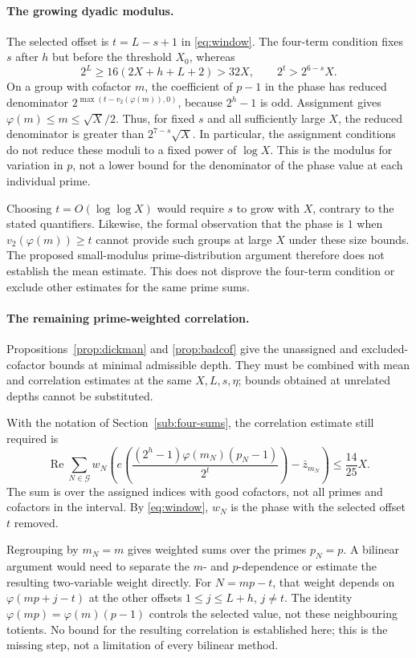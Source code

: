 \documentclass[11pt]{article}
\theoremstyle{plain}
\theoremstyle{definition}
\theoremstyle{remark}
\begin{document}
\paragraph{The growing dyadic modulus.}
The selected offset is $t=L-s+1$ in \eqref{eq:window}. The four-term
condition fixes $s$ after $h$ but before the threshold $X_0$, whereas
\[
 2^L\ge16(2X+h+L+2)>32X,\qquad 2^t>2^{6-s}X.
\]
On a group with cofactor $m$, the coefficient of $p-1$ in the phase
has reduced denominator $2^{\max(t-v_2(\varphi(m)),0)}$, because $2^h-1$
is odd. Assignment gives
$\varphi(m)\le m\le\sqrt X/2$. Thus, for fixed $s$ and all sufficiently
large $X$, the reduced denominator is greater than
$2^{7-s}\sqrt X$. In particular, the assignment conditions do not reduce
these moduli to a fixed power of $\log X$. This is the modulus for
variation in $p$, not a lower bound for the denominator of the phase
value at each individual prime.

Choosing $t=O(\log\log X)$ would require $s$ to grow with $X$, contrary
to the stated quantifiers. Likewise, the formal observation that the phase
is $1$ when $v_2(\varphi(m))\ge t$ cannot provide such groups at large $X$
under these size bounds. The proposed small-modulus prime-distribution
argument therefore does not establish the mean estimate. This does not
disprove the four-term condition or exclude other estimates for the same
prime sums.

\paragraph{The remaining prime-weighted correlation.}
Propositions~\ref{prop:dickman} and \ref{prop:badcof} give the unassigned
and excluded-cofactor bounds at minimal admissible depth. They must be
combined with mean and correlation estimates at the same $X,L,s,\eta$;
bounds obtained at unrelated depths cannot be substituted.

With the notation of Section~\ref{sub:four-sums}, the correlation estimate
still required is
\[
 \operatorname{Re}\sum_{N\in\mathcal G}w_N
 \left(e\!\left(\frac{(2^h-1)\varphi(m_N)(p_N-1)}{2^t}\right)
       -\bar z_{m_N}\right)\le\frac{14}{25}X.
\]
The sum is over the assigned indices with good cofactors, not all primes
and cofactors in the interval. By \eqref{eq:window}, $w_N$ is the phase
with the selected offset $t$ removed.

Regrouping by $m_N=m$ gives weighted sums over the primes $p_N=p$.
A bilinear argument would need to separate the $m$- and $p$-dependence or
estimate the resulting two-variable weight directly. For $N=mp-t$,
that weight depends on $\varphi(mp+j-t)$ at the other offsets
$1\le j\le L+h$, $j\ne t$. The identity
$\varphi(mp)=\varphi(m)(p-1)$ controls the selected value, not these
neighbouring totients. No bound for the resulting correlation is
established here; this is the missing step, not a limitation of every
bilinear method.
\end{document}
